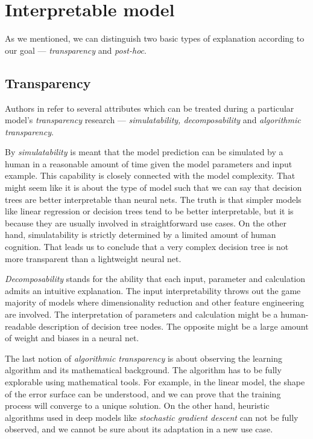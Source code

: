 \section{Interpretable model}
As we mentioned, we can distinguish two basic types of explanation according to our goal --- \emph{transparency} and \emph{post-hoc}.

\subsection{Transparency}
Authors in \cite{Lipton2016} refer to several attributes which can be treated during a particular model's \emph{transparency} research --- \emph{simulatability, decomposability} and \emph{algorithmic transparency}.

By \emph{simulatability} is meant that the model prediction can be simulated by a human in a reasonable amount of time given the model parameters and input example. This capability is closely connected with the model complexity. That might seem like it is about the type of model such that we can say that decision trees are better interpretable than neural nets. The truth is that simpler models like linear regression or decision trees tend to be better interpretable, but it is because they are usually involved in straightforward use cases. On the other hand, simulatability is strictly determined by a limited amount of human cognition. That leads us to conclude that a very complex decision tree is not more transparent than a lightweight neural net.

\emph{Decomposability} stands for the ability that each input, parameter and calculation admits an intuitive explanation. The input interpretability throws out the game majority of models where dimensionality reduction and other feature engineering are involved. The interpretation of parameters and calculation might be a human-readable description of decision tree nodes. The opposite might be a large amount of weight and biases in a neural net.

The last notion of \emph{algorithmic transparency} is about observing the learning algorithm and its mathematical background. The algorithm has to be fully explorable using mathematical tools. For example, in the linear model, the shape of the error surface can be understood, and we can prove that the training process will converge to a unique solution. On the other hand, heuristic algorithms used in deep models like \emph{stochastic gradient descent} can not be fully observed, and we cannot be sure about its adaptation in a new use case.

